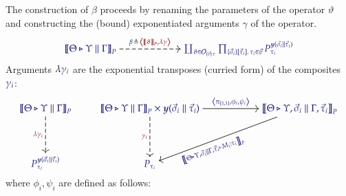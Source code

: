 \documentclass[11pt]{article}
\theoremstyle{definition}
\theoremstyle{remark}
\numberwithin{equation}{section}
\def\IModeColorName{MidnightBlue}
\def\OModeColorName{Maroon}
\newcommand\IMode[1]{{\color{\IModeColorName}{#1}}}
\newcommand\OMode[1]{{\color{\OModeColorName}{#1}}}
\newcommand\MkValence[3]{%
  \ifthenelse{\equal{#1}{}}{}{%
    \{#1\}%
  }%
  \ifthenelse{\equal{#2}{}}{}{%
    [#2]%
  }.\, #3%
}
\newcommand\MkArity[2]{(#1)\, #2}
\newcommand\Operators{\mathcal{O}}
\newcommand\Tuple[1]{\left\langle#1 \right\rangle}
\newcommand\Define[2]{\IMode{#1}\triangleq\OMode{#2}}
\newcommand\SemBrackets[1]{\left\llbracket#1\right\rrbracket}
\newcommand\Yoneda[1]{\boldsymbol{y} (#1)}
\begin{document}
The construction of $\beta$ proceeds by renaming the parameters of the operator
$\vartheta$ and constructing the (bound) exponentiated arguments $\gamma$ of the
operator.
\[
  \begin{tikzcd}[cramped, ampersand replacement = \&]
    {\IMode{
      {\SemBrackets{
        \Theta\triangleright\Upsilon\parallel\Gamma
      }}_{P}
    }}
      \arrow[
        , r
        , dashed
        , "
          \Define{
            \beta\,
          }{
            \,\Tuple{
              \SemBrackets{\vartheta}_P, \lambda\gamma
            }
          }
          "
      ]
\&[4.0em]
    {\IMode{
      \coprod_{
        \vartheta\in \Operators_{\MkArity{\vec{v}}{\tau}}
      }
      \prod_{
        \MkValence{\vec{\sigma}_i}{\vec{\tau}_i}{\tau_i}\in\vec{v}
      }
      P_{\tau_i}^{\Yoneda{\vec{\sigma}_i\parallel\vec{\tau}_i}}
    }}
  \end{tikzcd}
\]
Arguments $\lambda\IMode{{\gamma}_{i}}$ are the exponential transposes (curried
form) of the composites $\IMode{{\gamma}_{i}}$:
\[
  \begin{tikzcd}[cramped, ampersand replacement = \&]
    {\IMode{
      {\SemBrackets{
        \Theta\triangleright\Upsilon\parallel\Gamma
      }}_{P}
    }}
      \arrow[
        , dashed
        , d
        , swap
        , "\OMode{\lambda{\gamma}_{i}}"
      ]
\&
    {\IMode{
      {\SemBrackets{
        \Theta\triangleright\Upsilon\parallel\Gamma
      }}_{P}
      \times
      \Yoneda{
        \vec{\sigma}_{i}\parallel\vec{\tau}_{i}}
      }
    }
      \arrow[
        , r
        , "
          \IMode{
            \Tuple{
              {\pi}_{[1,1]},
              {\phi}_{i},
              {\psi}_{i}
            }
          }
          "
        ]
      \arrow[
        , dashed
        , d
        , swap
        , "\OMode{{\gamma}_{i}}"
      ]
\&[3.5em]
    {\IMode{
      \SemBrackets{
        \Theta\triangleright\Upsilon,
        \vec{\sigma}_i\parallel\Gamma,
        \vec{\tau}_{i}
      }_{P}
    }}
      \ar{dl}[
        , rotate = +19.25
        , xshift = -4.5em
        , yshift = -0.2em
      ]{\IMode{\SemBrackets{\Theta\triangleright\Upsilon,\vec{\sigma}_{i}\parallel\Gamma,\vec{\tau}_{i}\vdash M_i:\tau_i}_P}}
\\[2.0em]
    {\IMode{{P}_{{\tau}_{i}}^{\Yoneda{\vec{\sigma}_{i}\parallel\vec{\tau}_{i}}}}}
\&
    {\IMode{P_{{\tau}_{i}}}}
\&
  \end{tikzcd}
\]
where $\phi_i,\psi_i$ are defined as follows:
\end{document}
